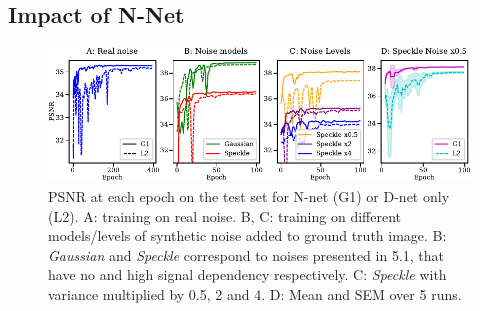 \documentclass{article}
\begin{document}
\subsection{Impact of N-Net}
\begin{figure}[ht]
\begin{center}
\centerline{\includegraphics[width=\columnwidth]{fig_convergence_1col.pdf}}
\caption{PSNR at each epoch on the test set for N-net (G1) or D-net only (L2). A: training on real noise. B, C: training on different models/levels of synthetic noise added to ground truth image. B: \textit{Gaussian} and \textit{Speckle} correspond to noises presented in 5.1, that have no and high signal dependency respectively. C: \textit{Speckle} with variance multiplied by 0.5, 2 and 4. D: Mean and SEM over 5 runs.}
\label{si:fig:convergence}
\end{center}
\end{figure}
\end{document}
